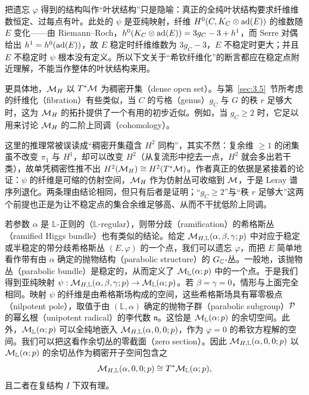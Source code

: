 \begin{yizhu}[含糊点拨]
把遗忘 $\varphi$ 得到的结构叫作“叶状结构”只是隐喻：真正的全纯叶状结构要求纤维维数恒定、过每点有叶。此处的 $\psi$ 是亚纯映射，纤维 $H^0(C,K_C\otimes{\rm ad}(E))$ 的维数随 $E$ 变化——由 Riemann--Roch，$h^0(K_C\otimes{\rm ad}(E))=3g_C-3+h^1$，而 Serre 对偶给出 $h^1=h^0({\rm ad}(E))$，故 $E$ 稳定时纤维维数为 $3g_C-3$，$E$ 不稳定时更大；并且 $E$ 不稳定时 $\psi$ 根本没有定义。所以下文关于“希钦纤维化”的断言都应在稳定点附近理解，不能当作整体的叶状结构来用。
\end{yizhu}

更具体地，${{\mathcal{M}}_H}$ 以 $T^*{\mathcal{M}}$ 为稠密开集（dense open set）。与第~\ref{sec:3.5}~节所考虑的纤维化（fibration）有些类似，当 $C$ 的亏格（genus）$g_C$ 与 $G$ 的秩 $r$ 足够大时，这为 ${{\mathcal{M}}_H}$ 的拓扑提供了一个有用的初步近似。例如，当 $g_C\geq 2$ 时，它足以用来讨论 ${{\mathcal{M}}_H}$ 的二阶上同调（cohomology）。

\begin{yizhu}[含糊点拨]
这里的推理常被误读成“稠密开集蕴含 $H^2$ 同构”，其实不然：复余维 $\geq 1$ 的闭集虽不改变 $\pi_1$ 与 $H^1$，却可以改变 $H^2$（从复流形中挖去一点，$H^2$ 就会多出若干类），故单凭稠密性推不出 $H^2({{\mathcal{M}}_H})\cong H^2(T^*{\mathcal{M}})$。作者真正的依据是紧接着的论证：$\psi$ 的纤维是可缩的仿射空间，${{\mathcal{M}}_H}$ 作为仿射丛可收缩到 ${\mathcal{M}}$，于是 Leray 谱序列退化。两条理由结论相同，但只有后者是证明；“$g_C\geq 2$”与“秩 $r$ 足够大”这两个前提也正是为让不稳定点的集合余维足够高、从而不干扰低阶上同调。
\end{yizhu}

若参数 $\alpha$ 是 $\mathbb{L}$-正则的（$\mathbb{L}$-regular），则带分歧（ramification）的希格斯丛（ramified Higgs bundle）也有类似的结论。给定 ${\mathcal{M}}_{H,\mathbb{L}}(\alpha,\beta,\gamma;p)$ 中对应于稳定或半稳定的带分歧希格斯丛 $(E,\varphi)$ 的一个点，我们可以遗忘 $\varphi$，而把 $E$ 简单地看作带有由 $\alpha$ 确定的抛物结构（parabolic structure）的 $G_{\mathbb{C}}$-丛。一般地，该抛物丛（parabolic bundle）是稳定的，从而定义了 ${\mathcal{M}}_\mathbb{L}(\alpha;p)$ 中的一个点。于是我们得到亚纯映射 $\psi:{\mathcal{M}}_{H,\mathbb{L}}(\alpha,\beta,\gamma;p)\to {\mathcal{M}}_\mathbb{L}(\alpha;p)$。若 $\beta=\gamma=0$，情形与上面完全相同。映射 $\psi$ 的纤维是由希格斯场构成的空间，这些希格斯场具有幂零极点（nilpotent pole），取值于由 $(\mathbb{L},\alpha)$ 确定的抛物子群（parabolic subgroup）$\mathcal{P}$ 的幂幺根（unipotent radical）的李代数 $\mathfrak n$。这恰是 ${\mathcal{M}}_\mathbb{L}(\alpha;p)$ 的余切空间。此外，${\mathcal{M}}_\mathbb{L}(\alpha;p)$ 可以全纯地嵌入 ${\mathcal{M}}_{H,\mathbb{L}}(\alpha,0,0;p)$，作为 $\varphi=0$ 的希钦方程解的空间。我们可以把这看作余切丛的零截面（zero section）。因此 ${\mathcal{M}}_{H,\mathbb{L}}(\alpha,0,0;p)$ 以 ${\mathcal{M}}_\mathbb{L}(\alpha;p)$ 的余切丛作为稠密开子空间包含之
\setcounter{equation}{72}
\begin{equation}\label{eq:3.73}
  {\mathcal{M}}_{H,\mathbb{L}}(\alpha,0,0;p)\cong T^*{\mathcal{M}}_\mathbb{L}(\alpha;p),
\end{equation}
且二者在复结构 $I$ 下双有理。

